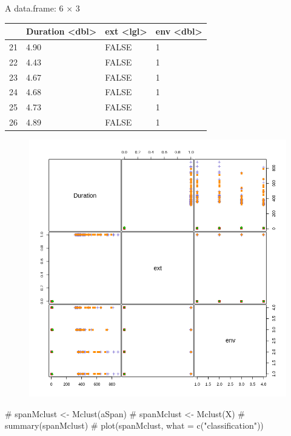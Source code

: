 \documentclass[
  letterpaper,
  DIV=11,
  numbers=noendperiod]{scrartcl}
\newenvironment{Shaded}{\begin{snugshade}}{\end{snugshade}}
\newcommand{\CommentTok}[1]{\textcolor[rgb]{0.37,0.37,0.37}{#1}}
\begin{document}
A data.frame: 6 × 3

\begin{longtable}[]{@{}llll@{}}
\toprule()
& Duration \textless dbl\textgreater{} & ext \textless lgl\textgreater{}
& env \textless dbl\textgreater{} \\
\midrule()
\endhead
21 & 4.90 & FALSE & 1 \\
22 & 4.43 & FALSE & 1 \\
23 & 4.67 & FALSE & 1 \\
24 & 4.68 & FALSE & 1 \\
25 & 4.73 & FALSE & 1 \\
26 & 4.89 & FALSE & 1 \\
\bottomrule()
\end{longtable}

\begin{figure}[H]

{\centering \includegraphics{dss-span-analysis-rev5_files/figure-pdf/cell-39-output-2.png}

}

\end{figure}

\begin{Shaded}
\begin{Highlighting}[]
\CommentTok{\# spanMclust \textless{}{-} Mclust(aSpan)}
\CommentTok{\# spanMclust \textless{}{-} Mclust(X)}
\CommentTok{\# summary(spanMclust)}
\CommentTok{\# plot(spanMclust, what = c("classification"))}
\end{Highlighting}
\end{Shaded}
\end{document}
